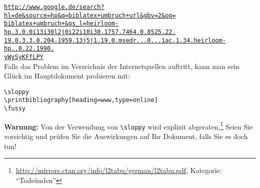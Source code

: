 \newcommand{\mylongurl}[1]{%
\href{http://www.google.de/search?hl=de&source=hp&q=biblatex+umbruch+url&gbv=2&oq=biblatex+umbruch+&gs_l=heirloom-hp.3.0.0i13i30l2j0i22i10i30.1757.7464.0.8525.22.19.0.3.3.0.204.1959.13j5j1.19.0.msedr...0...1ac.1.34.heirloom-hp..0.22.1990.yWySyKFfLPY}{\texttt{#1}}\\}

\mylongurl{http://www.google.de/search?hl=de\&source=hp\&q=biblatex+umbruch+url\&gbv=2\&oq=}
\mylongurl{biblatex+umbruch+\&gs\_l=heirloom-hp.3.0.0i13i30l2j0i22i10i30.1757.7464.0.8525.22.}
\mylongurl{19.0.3.3.0.204.1959.13j5j1.19.0.msedr...0...1ac.1.34.heirloom-hp..0.22.1990.}
\mylongurl{yWySyKFfLPY}

Falls das Problem im Verzeichnis der Internetquellen auftritt, kann man sein Glück im Hauptdokument probieren mit:
\begin{lstlisting}
\sloppy
\printbibliography[heading=www,type=online]
\fussy
\end{lstlisting}


\textbf{Warnung:} Von der Verwendung von \verb|\sloppy| wird explizit abgeraten,\footnote{\url{http://mirrors.ctan.org/info/l2tabu/german/l2tabu.pdf}, Kategorie: \enquote{Todsünden}}
Seien Sie vorsichtig und prüfen Sie die Auswirkungen auf Ihr Dokument, falls Sie es doch tun!